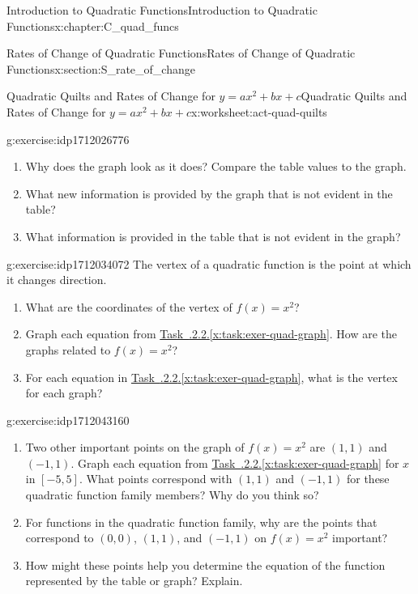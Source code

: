 \documentclass[oneside,10pt,]{book}
\newcommand{\xreffont}{\relax}
\numberwithin{equation}{chapter}
\begin{document}
\begin{chapterptx}{Introduction to Quadratic Functions}{}{Introduction to Quadratic Functions}{}{}{x:chapter:C_quad_funcs}
\begin{sectionptx}{Rates of Change of Quadratic Functions}{}{Rates of Change of Quadratic Functions}{}{}{x:section:S_rate_of_change}
\begin{worksheet-subsection}{Quadratic Quilts and Rates of Change for \(y = ax^2 + bx + c\)}{}{Quadratic Quilts and Rates of Change for \(y = ax^2 + bx + c\)}{}{}{x:worksheet:act-quad-quilts}
\begin{divisionexercise}{4}{}{}{g:exercise:idp1712026776}
\begin{enumerate}[font=\bfseries,label=(\alph*),ref=\alph*]
\item{}Why does the graph look as it does? Compare the table values to the graph.%
\item{}What new information is provided by the graph that is not evident in the table?%
\item{}What information is provided in the table that is not evident in the graph?%
\end{enumerate}
\end{divisionexercise}%
\begin{divisionexercise}{5}{}{}{g:exercise:idp1712034072}%
The vertex of a quadratic function is the point at which it changes direction.%
\begin{enumerate}[font=\bfseries,label=(\alph*),ref=\alph*]
\item{}What are the coordinates of the vertex of \(f(x)=x^2\)?%
\item{}Graph each equation from \hyperref[x:task:exer-quad-graph]{Task~{\xreffont 4.4.2.2}.{\xreffont\ref{x:task:exer-quad-graph}}}. How are the graphs related to \(f(x)=x^2\)?%
\item{}For each equation in \hyperref[x:task:exer-quad-graph]{Task~{\xreffont 4.4.2.2}.{\xreffont\ref{x:task:exer-quad-graph}}}, what is the vertex for each graph?%
\end{enumerate}
\end{divisionexercise}%
\begin{divisionexercise}{6}{}{}{g:exercise:idp1712043160}%
\begin{enumerate}[font=\bfseries,label=(\alph*),ref=\alph*]
\item{}Two other important points on the graph of \(f(x)=x^2 \) are \((1,1)\) and \((-1,1)\). Graph each equation from \hyperref[x:task:exer-quad-graph]{Task~{\xreffont 4.4.2.2}.{\xreffont\ref{x:task:exer-quad-graph}}} for \(x\) in \([-5, 5]\). What points correspond with \((1, 1)\) and \((-1, 1)\) for these quadratic function family members? Why do you think so?%
\item{}For functions in the quadratic function family, why are the points that correspond to \((0, 0)\), \((1, 1)\), and \((-1, 1)\) on \(f(x) = x^2\) important?%
\item{}How might these points help you determine the equation of the function represented by the table or graph? Explain.%
\end{enumerate}
\end{divisionexercise}%
\end{worksheet-subsection}
\restoregeometry
%
%

\end{sectionptx}
\end{chapterptx}
\end{document}
